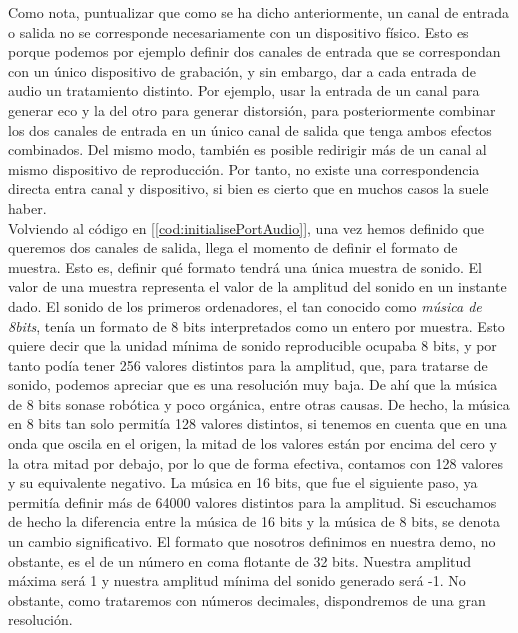 Como nota, puntualizar que como se ha dicho anteriormente, un canal de entrada o salida no se corresponde necesariamente con un dispositivo físico. Esto es porque podemos por ejemplo definir dos canales de entrada que se correspondan con un único dispositivo de grabación, y sin embargo, dar a cada entrada de audio un tratamiento distinto. Por ejemplo, usar la entrada de un canal para generar eco y la del otro para generar distorsión, para posteriormente combinar los dos canales de entrada en un único canal de salida que tenga ambos efectos combinados. Del mismo modo, también es posible redirigir más de un canal al mismo dispositivo de reproducción. Por tanto, no existe una correspondencia directa entra canal y dispositivo, si bien es cierto que en muchos casos la suele haber.\\

Volviendo al código en [\ref{cod:initialisePortAudio}], una vez hemos definido que queremos dos canales de salida, llega el momento de definir el formato de muestra. Esto es, definir qué formato tendrá una única muestra de sonido. El valor de una muestra representa el valor de la amplitud del sonido en un instante dado. El sonido de los primeros ordenadores, el tan conocido como \emph{música de 8bits}, tenía un formato de 8 bits interpretados como un entero por muestra. Esto quiere decir que la unidad mínima de sonido reproducible ocupaba 8 bits, y por tanto podía tener 256 valores distintos para la amplitud, que, para tratarse de sonido, podemos apreciar que es una resolución muy baja. De ahí que la música de 8 bits sonase robótica y poco orgánica, entre otras causas. De hecho, la música en 8 bits tan solo permitía 128 valores distintos, si tenemos en cuenta que en una onda que oscila en el origen, la mitad de los valores están por encima del cero y la otra mitad por debajo, por lo que de forma efectiva, contamos con 128 valores y su equivalente negativo. La música en 16 bits, que fue el siguiente paso, ya permitía definir más de 64000 valores distintos para la amplitud. Si escuchamos de hecho la diferencia entre la música de 16 bits y la música de 8 bits, se denota un cambio significativo. El formato que nosotros definimos en nuestra demo, no obstante, es el de un número en coma flotante de 32 bits. Nuestra amplitud máxima será 1 y nuestra amplitud mínima del sonido generado será -1. No obstante, como trataremos con números decimales, dispondremos de una gran resolución.\\


